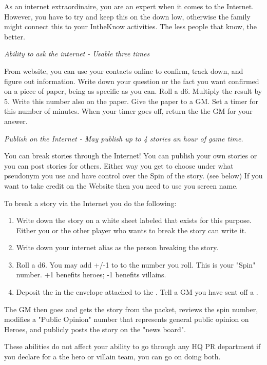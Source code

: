 \documentclass[green]{LRSguildcamp1}
\begin{document}
\name{\gInternetPR{}}

As an internet extraordinaire, you are an expert when it comes to the Internet. However, you have to try and keep this on the down low, otherwise the family might connect this to your IntheKnow activities. The less people that know, the better. 

\textit{Ability to ask the internet - Usable three times}

From \pTweenwebsite{} website, you can use your contacts online to confirm, track down, and figure out information. Write down your question or the fact you want confirmed on a piece of paper, being as specific as you can. Roll a d6. Multiply the result by 5. Write this number also on the paper. Give the paper to a GM. Set a timer for this number of minutes. When your timer goes off, return the the GM for your answer. 

\textit{Publish on the Internet - May publish up to 4 stories an hour of game time.}

You can break stories through the Internet! You can publish your own stories or you can post stories for others. Either way you get to choose under what pseudonym you use and have control over the Spin of the story. (see below) If you want to take credit on the \pTweenwebsite{} Website then you need to use you screen name.

To break a story via the Internet you do the following:
\begin{enumerate}
\item Write down the story on a white sheet labeled \wPressRelease{} that exists for this purpose. Either you or the other player who wants to break the story can write it. 
\item Write down your internet alias as the person breaking the story.  
\item Roll a d6.  You may add +/-1 to to the number you roll. This is your "Spin" number.  +1 benefits heroes; -1 benefits villains.
\item Deposit the \wPressRelease{} in the envelope attached to the \sComputer{}. 
Tell a GM you have sent off a \wPressRelease{}.
\end{enumerate}

The GM then goes and gets the story from the packet, reviews the spin number, modifies a "Public Opinion" number that represents general public opinion on Heroes, and publicly posts the story on the "news board". 

These abilities do not affect your ability to go through any HQ PR department if you declare for a the hero or villain team, you can go on doing both. 
\end{document}
